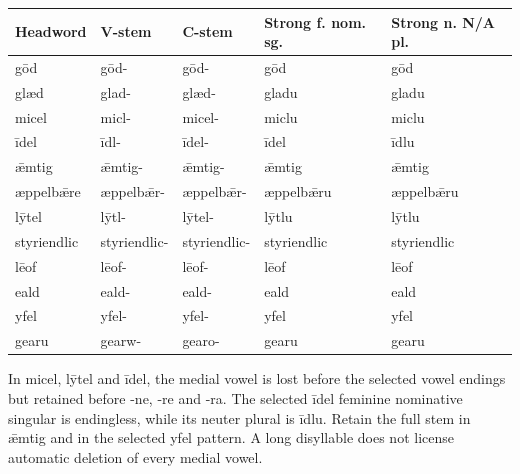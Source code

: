 \par\begingroup
\fontsize{10.5}{13.2}\selectfont
\setlength{\LTleft}{0pt}\setlength{\LTright}{\fill}
\noindent
\begin{tabular}{@{}>{\raggedright\arraybackslash}p{19.73mm}>{\raggedright\arraybackslash}p{21.53mm}>{\raggedright\arraybackslash}p{21.53mm}>{\raggedright\arraybackslash}p{25.38mm}>{\raggedright\arraybackslash}p{24.58mm}@{}}
\toprule
\textbf{Headword} & \textbf{V-stem} & \textbf{C-stem} & \textbf{Strong f. nom. sg.} & \textbf{Strong n. N/\allowbreak{}A pl.} \\
\midrule
gōd & gōd- & gōd- & gōd & gōd \\
glæd & glad- & glæd- & gladu & gladu \\
micel & micl- & micel- & miclu & miclu \\
īdel & īdl- & īdel- & īdel & īdlu \\
ǣmtig & ǣmtig- & ǣmtig- & ǣmtig & ǣmtig \\
æppelbǣre & æppelbǣr- & æppelbǣr- & æppelbǣru & æppelbǣru \\
lȳtel & lȳtl- & lȳtel- & lȳtlu & lȳtlu \\
styriendlic & styriendlic- & styriendlic- & styriendlic & styriendlic \\
lēof & lēof- & lēof- & lēof & lēof \\
eald & eald- & eald- & eald & eald \\
yfel & yfel- & yfel- & yfel & yfel \\
gearu & gearw- & gearo- & gearu & gearu \\
\bottomrule
\end{tabular}
\par\endgroup

In micel, lȳtel and īdel, the medial vowel is lost before the selected vowel endings but retained before -ne, -re and -ra. The selected īdel feminine nominative singular is endingless, while its neuter plural is īdlu. Retain the full stem in ǣmtig and in the selected yfel pattern. A long disyllable does not license automatic deletion of every medial vowel.

